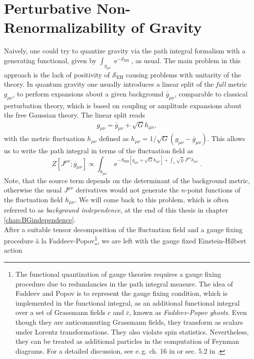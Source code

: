 \section{Perturbative Non-Renormalizability of Gravity}
Naively, one could try to quantize gravity via the path integral formalism with a generating functional, given by $\int_{g_{\mu\nu}} \operatorname{e}^{-\mathcal{S}_{\mathrm{EH}}}$, as usual. The main problem in this approach is the lack of positivity of $\mathcal{S}_{\mathrm{EH}}$ causing problems with unitarity of the theory. In quantum gravity one usually introduces a linear split of the \textit{full} metric $g_{\mu\nu}$, to perform expansions about a given background $\bar{g}_{\mu\nu}$, comparable to classical perturbation theory, which is based on coupling or amplitude expansions about the free Gaussian theory. The linear split reads
\begin{align}
	g_{\mu\nu} = \bar{g}_{\mu\nu} + \sqrt{G}h_{\mu\nu},
\end{align}
with the metric fluctuation $h_{\mu\nu}$ defined as $h_{\mu\nu}= 1/\sqrt{G}\left(g_{\mu\nu}-\bar{g}_{\mu\nu}\right)$. This allows us to write the path integral in terms of the fluctuation field as
\begin{equation}
Z\left[J^{\mu \nu} ; \overline{g}_{\mu \nu}\right] \propto \int_{h_{\mu \nu}} \operatorname{e}^{-S_{\mathrm{EH}}\left[\overline{g}_{\mu \nu}+\sqrt{G} h_{\mu \nu}\right]+\int_x \sqrt{\bar{g}} \  J^{\mu \nu} h_{\mu \nu}}.
\end{equation}
Note, that the source term depends on the determinant of the background metric, otherwise the usual $J^{\mu\nu}$ derivatives would not generate the $n$-point functions of the fluctuation field $h_{\mu\nu}$. We will come back to this problem, which is often referred to as \textit{background independence}, at the end of this thesis in chapter \ref{chap:BGindependence}. \\
After a suitable tensor decomposition of the fluctuation field and a gauge fixing procedure \`a la Faddeev-Popov\footnote{The functional quantization of gauge theories requires a gauge fixing procedure due to redundancies in the path integral measure. The idea of Faddeev and Popov is to represent the gauge fixing condition, which is implemented in the functional integral, as an additional functional integral over a set of Grassmann fields $c$ and $\bar{c}$, known as \textit{Faddeev-Popov ghosts}. Even though they are anticommuting Grassmann fields, they transform as scalars under Lorentz transformations. They also violate spin statistics. Nevertheless, they can be treated as additional particles in the computation of Feynman diagrams. For a detailed discussion, see e.\,g. ch. 16 in \cite{PeskinSchroeder1995} or  sec. 5.2 in \cite{PawlowskiNPgaugeLecture}.},  we are left with the gauge fixed Einstein-Hilbert action
